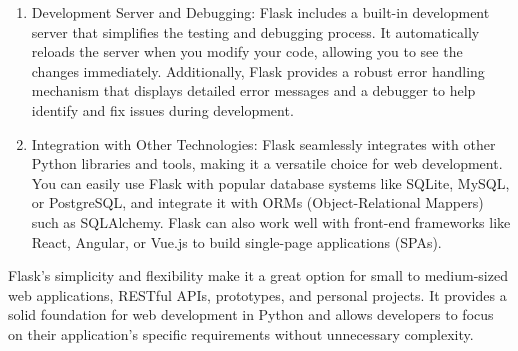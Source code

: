 \documentclass[12 pt, oneside]{book}
\begin{document}
\begin{enumerate}
\item  Development Server and Debugging: Flask includes a built-in development server that simplifies the testing and debugging process. It automatically reloads the server when you modify your code, allowing you to see the changes immediately. Additionally, Flask provides a robust error handling mechanism that displays detailed error messages and a debugger to help identify and fix issues during development.

\item Integration with Other Technologies: Flask seamlessly integrates with other Python libraries and tools, making it a versatile choice for web development. You can easily use Flask with popular database systems like SQLite, MySQL, or PostgreSQL, and integrate it with ORMs (Object-Relational Mappers) such as SQLAlchemy. Flask can also work well with front-end frameworks like React, Angular, or Vue.js to build single-page applications (SPAs).
  
\end{enumerate}
Flask's simplicity and flexibility make it a great option for small to medium-sized web applications, RESTful APIs, prototypes, and personal projects. It provides a solid foundation for web development in Python and allows developers to focus on their application's specific requirements without unnecessary complexity.

 

\end{document}
